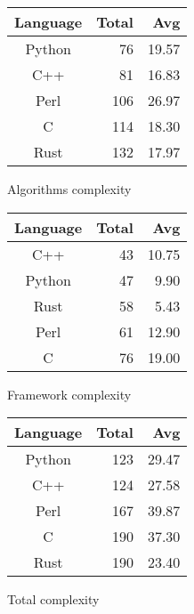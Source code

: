 \begin{subtable}{0.33\textwidth}
    \centering
    \begin{tabular}{|c|r|r|}
        \hline
        Language & Total & Avg \\
        \hline
        Python & 76 & 19.57 \\
        C++ & 81 & 16.83 \\
        Perl & 106 & 26.97 \\
        C & 114 & 18.30 \\
        Rust & 132 & 17.97 \\
        \hline
    \end{tabular}
    \caption{Algorithms complexity}
    \label{table:cyclomatic:algorithm}
\end{subtable}%
\begin{subtable}{0.33\textwidth}
    \centering
    \begin{tabular}{|c|r|r|}
        \hline
        Language & Total & Avg \\
        \hline
        C++ & 43 & 10.75 \\
        Python & 47 & 9.90 \\
        Rust & 58 & 5.43 \\
        Perl & 61 & 12.90 \\
        C & 76 & 19.00 \\
        \hline
    \end{tabular}
    \caption{Framework complexity}
    \label{table:cyclomatic:framework}
\end{subtable}%
\begin{subtable}{0.33\textwidth}
    \centering
    \begin{tabular}{|c|r|r|}
        \hline
        Language & Total & Avg \\
        \hline
        Python & 123 & 29.47 \\
        C++ & 124 & 27.58 \\
        Perl & 167 & 39.87 \\
        C & 190 & 37.30 \\
        Rust & 190 & 23.40 \\
        \hline
    \end{tabular}
    \caption{Total complexity}
    \label{table:cyclomatic:total}
\end{subtable}
